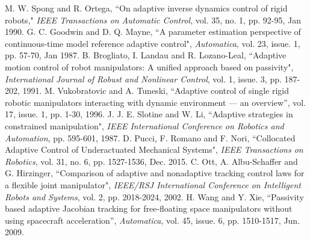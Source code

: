\documentclass[letterpaper, 10 pt, conference]{ieeeconf}  %
\begin{document}
\begin{thebibliography}{99}
 M. W. Spong and R. Ortega, ``On adaptive inverse dynamics control of rigid robots," {\em IEEE Transactions on Automatic Control}, vol. 35, no. 1, pp. 92-95, Jan 1990.
 G. C. Goodwin and D. Q. Mayne, ``A parameter estimation perspective of continuous-time model reference adaptive control", {\em Automatica}, vol. 23, issue. 1, pp. 57-70, Jan 1987.
 B. Brogliato, I. Landau and R. Lozano-Leal, ``Adaptive motion control of robot manipulators: A unified approach based on passivity", {\em International Journal of Robust and Nonlinear Control}, vol. 1, issue. 3, pp. 187-202, 1991.
 M. Vukobratovic and A. Tuneski, ``Adaptive control of single rigid robotic manipulators interacting with dynamic environment — an overview'', vol. 17, issue. 1, pp. 1-30, 1996.
 J. J. E. Slotine and W. Li, ``Adaptive strategies in constrained manipulation", {\em IEEE International Conference on Robotics and Automation}, pp. 595-601, 1987.
 D. Pucci, F. Romano and F. Nori, ``Collocated Adaptive Control of Underactuated Mechanical Systems", {\em IEEE Transactions on Robotics}, vol. 31, no. 6, pp. 1527-1536, Dec. 2015.
 C. Ott, A. Albu-Schaffer and G. Hirzinger, ``Comparison of adaptive and nonadaptive tracking control laws for a flexible joint manipulator", {\em IEEE/RSJ International Conference on Intelligent Robots and Systems}, vol. 2, pp. 2018-2024, 2002.
 H. Wang and Y. Xie, ``Passivity based adaptive Jacobian tracking for free-floating space manipulators without using spacecraft acceleration'', {\em Automatica}, vol. 45, issue. 6, pp. 1510-1517, Jun. 2009.
\end{thebibliography}
\end{document}
